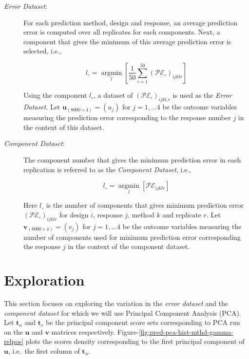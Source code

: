 \documentclass[12pt,3p,authoryear]{elsarticle}
\begin{document}
\begin{description}
\item[\emph{Error Dataset}:]
For each prediction method, design and response, an average prediction
error is computed over all replicates for each components. Next, a
component that gives the minimum of this average prediction error is
selected, i.e.,

\begin{equation}
  l_\circ = \operatorname*{argmin}_{l}\left[\frac{1}{50}\sum_{i=1}^{50}{\left(\mathcal{PE}_\circ\right)_{ijklr}}\right]
  \label{eq:min-pred}
  \end{equation}

Using the component \(l_\circ\), a dataset of
\(\left(\mathcal{PE}_\circ\right)_{ijkl_\circ r}\) is used as the
\emph{Error Dataset}. Let \(\mathbf{u}_{(8000 \times 4)} = (u_j)\) for
\(j = 1, \ldots 4\) be the outcome variables measuring the prediction
error corresponding to the response number \(j\) in the context of this
dataset.
\item[\emph{Component Dataset}:]
The component number that gives the minimum prediction error in each
replication is referred to as the \emph{Component Dataset}, i.e.,

\begin{equation}
  l_{\circ} = \operatorname*{argmin}_{l}\left[\mathcal{PE}_{ijklr}\right]
  \label{eq:min-comp}
  \end{equation}

Here \(l_\circ\) is the number of components that gives minimum
prediction error \(\left(\mathcal{PE}_\circ\right)_{ijklr}\) for design
\(i\), response \(j\), method \(k\) and replicate \(r\). Let
\(\mathbf{v}_{(8000 \times 4)} = (v_j)\) for \(j = 1, \ldots 4\) be the
outcome variables measuring the number of components used for minimum
prediction error corresponding the response \(j\) in the context of the
component dataset.
\end{description}

\section{Exploration}\label{exploration}

This section focuses on exploring the variation in the \emph{error
dataset} and the \emph{component dataset} for which we will use
Principal Component Analysis (PCA). Let \(\mathbf{t}_u\) and
\(\mathbf{t}_v\) be the principal component score sets corresponding to
PCA run on the \(\mathbf{u}\) and \(\mathbf{v}\) matrices respectively.
Figure-\ref{fig:pred-pca-hist-mthd-gamma-relpos} plots the scores
density corresponding to the first principal component of
\(\mathbf{u}\), i.e.~the first column of \(\mathbf{t}_u\).
\end{document}
